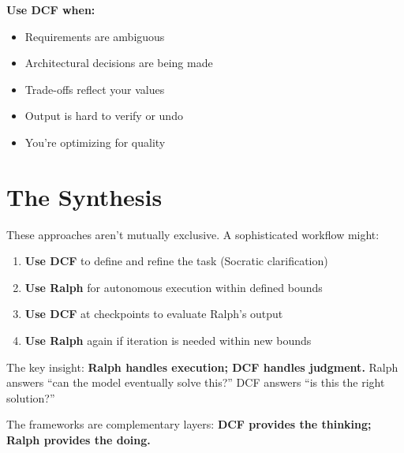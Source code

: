 \textbf{Use DCF when:}
\begin{itemize}
    \item Requirements are ambiguous
    \item Architectural decisions are being made
    \item Trade-offs reflect your values
    \item Output is hard to verify or undo
    \item You're optimizing for quality
\end{itemize}

\section{The Synthesis}

These approaches aren't mutually exclusive. A sophisticated workflow might:

\begin{enumerate}
    \item \textbf{Use DCF} to define and refine the task (Socratic clarification)
    \item \textbf{Use Ralph} for autonomous execution within defined bounds
    \item \textbf{Use DCF} at checkpoints to evaluate Ralph's output
    \item \textbf{Use Ralph} again if iteration is needed within new bounds
\end{enumerate}

The key insight: \textbf{Ralph handles execution; DCF handles judgment.} Ralph answers ``can the model eventually solve this?'' DCF answers ``is this the right solution?''

The frameworks are complementary layers: \textbf{DCF provides the thinking; Ralph provides the doing.}


